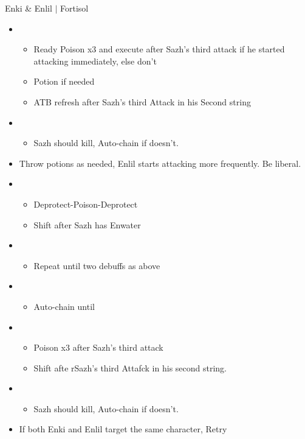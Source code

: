 \begin{battle}{Enki \& Enlil $|$ Fortisol}
\begin{multicols}{2}
\begin{itemize}
    \item \sixth
    \begin{itemize}
        \item Ready Poison x3 and execute after Sazh's third attack if he started attacking immediately, else don't
        \item Potion if needed
        \item ATB refresh after Sazh's third Attack in his Second string
    \end{itemize}
    \item \first
    \begin{itemize}
        \item Sazh should kill, Auto-chain if doesn't.
    \end{itemize}
    \item Throw potions as needed, Enlil starts attacking more frequently. Be liberal.
    \item \third
    \begin{itemize}
        \item Deprotect-Poison-Deprotect
        \item Shift after Sazh has Enwater
    \end{itemize}
    \item \fifth
    \begin{itemize}
        \item Repeat until two debuffs as above
    \end{itemize}
    \item \fourth
    \begin{itemize}
        \item Auto-chain until \stagger
    \end{itemize}
    \item \sixth
    \begin{itemize}
        \item Poison x3 after Sazh's third attack
        \item Shift afte rSazh's third Attafck in his second string.
    \end{itemize}
    \item \first
    \begin{itemize}
        \item Sazh should kill, Auto-chain if doesn't.
    \end{itemize}
\end{itemize}
\columnbreak    
\begin{itemize}
    \item If both Enki and Enlil target the same character, Retry

\end{itemize}
\end{multicols}
\end{battle}
